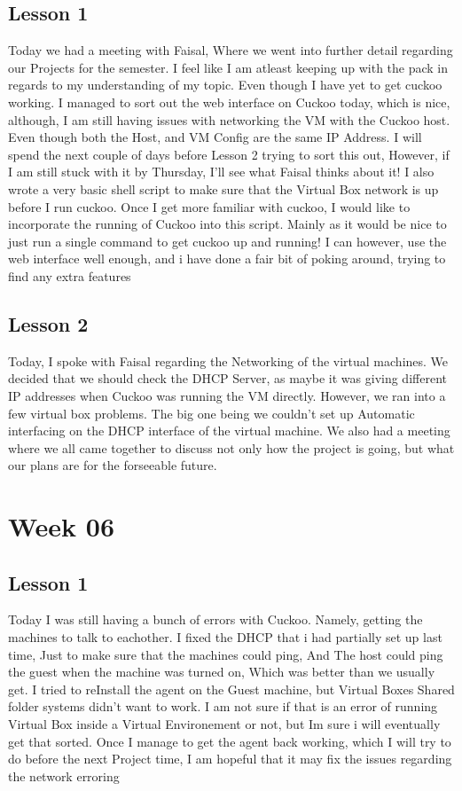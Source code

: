 \documentclass{article}
\begin{document}
\subsection{Lesson 1}
Today we had a meeting with Faisal, Where we went into further detail regarding our Projects for the semester. I feel like I am atleast keeping up with the pack in regards to my understanding of my topic. Even though I have yet to get cuckoo working. I managed to sort out the web interface on Cuckoo today, which is nice, although, I am still having issues with networking the VM with the Cuckoo host. Even though both the Host, and VM Config are the same IP Address. I will spend the next couple of days before Lesson 2 trying to sort this out, However, if I am still stuck with it by Thursday, I'll see what Faisal thinks about it! I also wrote a very basic shell script to make sure that the Virtual Box network is up before I run cuckoo. Once I get more familiar with cuckoo, I would like to incorporate the running of Cuckoo into this script. Mainly as it would be nice to just run a single command to get cuckoo up and running! I can however, use the web interface well enough, and i have done a fair bit of poking around, trying to find any extra features
\subsection{Lesson 2}
Today, I spoke with Faisal regarding the Networking of the virtual machines. We decided that we should check the DHCP Server, as maybe it was giving different IP addresses when Cuckoo was running the VM directly. However, we ran into a few virtual box problems. The big one being we couldn't set up Automatic interfacing on the DHCP interface of the virtual machine. We also had a meeting where we all came together to discuss not only how the project is going, but what our plans are for the forseeable future. 

\section{Week 06}
\subsection{Lesson 1}
Today I was still having a bunch of errors with Cuckoo. Namely, getting the machines to talk to eachother. I fixed the DHCP that i had partially set up last time, Just to make sure that the machines could ping, And The host could ping the guest when the machine was turned on, Which was better than we usually get. I tried to reInstall the agent on the Guest machine, but Virtual Boxes Shared folder systems didn't want to work. I am not sure if that is an error of running Virtual Box inside a Virtual Environement or not, but Im sure i will eventually get that sorted. Once I manage to get the agent back working, which I will try to do before the next Project time, I am hopeful that it may fix the issues regarding the network erroring 
\end{document}
